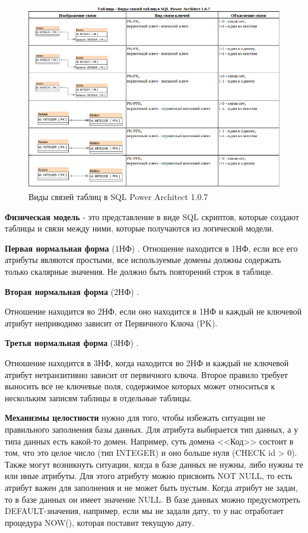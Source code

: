 \begin{figure}[!h]
    \centering

    \includegraphics[width=18cm]
    {assets/database/Relations/RelationsSqlPowerArchitect.png}

    \caption{Виды связей таблиц в SQL Power Architect 1.0.7}

    \label{fig:RelationsSqlPowerArchitect}
\end{figure}

\textbf{Физическая модель} - это представление в виде SQL скриптов, которые создают таблицы и связи между ними,
которые получаются из логической модели.

\textbf{Первая нормальная форма} (1НФ) \cite{habr_1nf_6nf}.
Отношение находится в 1НФ, если все его атрибуты являются простыми,
все используемые домены должны содержать только скалярные значения.
Не должно быть повторений строк в таблице.

\textbf{Вторая нормальная форма} (2НФ) \cite{habr_1nf_6nf}.

Отношение находится во 2НФ, если оно находится в 1НФ и каждый не ключевой атрибут неприводимо зависит от Первичного Ключа (PK).

\textbf{Третья нормальная форма} (3НФ) \cite{habr_1nf_6nf}.

Отношение находится в 3НФ, когда находится во 2НФ и каждый не ключевой атрибут нетранзитивно зависит от первичного ключа.
Второе правило требует выносить все не ключевые поля, содержимое которых может относиться к нескольким записям таблицы в отдельные таблицы.

\textbf{Механизмы целостности} нужно для того, чтобы избежать ситуации не правильного заполнения базы данных.
Для атрибута выбирается тип данных, а у типа данных есть какой-то домен. Например, суть домена <<Код>> состоит в том,
что это целое число (тип INTEGER) и оно больше нуля (CHECK id > 0).
Также могут возникнуть ситуации, когда в базе данных не нужны, либо нужны те или иные атрибуты.
Для этого атрибуту можно присвоить NOT NULL, то есть атрибут важен для заполнения и не может быть пустым.
Когда атрибут не задан, то в базе данных он имеет значение NULL.
В базе данных можно предусмотреть DEFAULT-значения, например, если мы не задали дату,
то у нас отработает процедура NOW(), которая поставит текущую дату.

